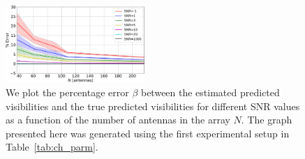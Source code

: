 \documentclass[useAMS,usenatbib]{mn2e}
\begin{document}
\begin{figure}
\includegraphics[width=0.47\textwidth]{./prec_error.pdf} 
\caption{We plot the percentage error $\beta$ between the estimated 
predicted visibilities and the true predicted visibilities for different SNR values as a function of the number of antennas in the array $N$. The graph presented here was generated using the first experimental setup in Table~\ref{tab:ch_parm}.}
\label{fig:prec_error}
\end{figure}

% 
% 
% 
% 
% 
% 
% 
\end{document}
